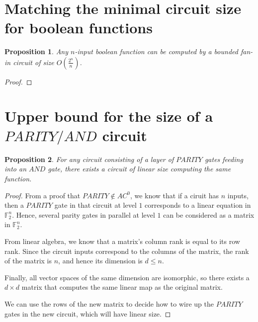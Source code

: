 \documentclass[letterpaper,11pt]{article}
\newtheorem{proposition}{Proposition}
\newcommand{\F}{\mathbb{F}}
\begin{document}
\section*{Matching the minimal circuit size for boolean functions}

\begin{proposition}
    Any $n$-input boolean function can be computed by a bounded fan-in circuit
    of size $O(\frac{2^n}{n})$.
\end{proposition}

\begin{proof}

\end{proof}

\section*{Upper bound for the size of a $PARITY/AND$ circuit}

\begin{proposition}
    For any circuit consisting of a layer of $PARITY$ gates feeding into an
    $AND$ gate, there exists a circuit of linear size computing the same
    function.
\end{proposition}

\begin{proof}
    From a proof that $PARITY \notin AC^0$, we know that if a ciruit has $n$
    inputs, then a $PARITY$ gate in that circuit at level $1$ corresponds to a
    linear equation in $\F_2^n$. Hence, several parity gates in parallel at
    level $1$ can be considered as a matrix in $\F_2^n$.

    From linear algebra, we know that a matrix's column rank is equal to its
    row rank. Since the circuit inputs correspond to the columns of the matrix,
    the rank of the matrix is $n$, and hence its dimension is $d \leq n$.

    Finally, all vector spaces of the same dimension are isomorphic, so there
    exists a $d \times d$ matrix that computes the same linear map as the
    original matrix.

    We can use the rows of the new matrix to decide how to wire up the $PARITY$
    gates in the new circuit, which will have linear size.
\end{proof}
\end{document}
